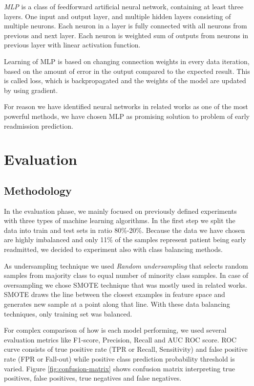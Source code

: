 \documentclass[runningheads]{llncs}
\begin{document}
\emph{MLP} is a class of feedforward artificial neural network, containing at least three layers. One input and output layer, and multiple hidden layers consisting of multiple neurons. Each neuron in a layer is fully connected with all neurons from previous and next layer. Each neuron is weighted sum of outputs from neurons in previous layer with linear activation function.

Learning of MLP is based on changing connection weights in every data iteration, based on the amount of error in the output compared to the expected result. This is called loss, which is backpropagated and the weights of the model are updated by using gradient.

For reason we have identified neural networks in related works as one of the most powerful methods, we have chosen MLP as promising solution to problem of early readmission prediction.


\section{Evaluation}

\subsection{Methodology}
\label{sec:evaluation-methodology}
In the evaluation phase, we mainly focused on previously defined experiments with three types of machine learning algorithms. In the first step we split the data into train and test sets in ratio 80\%-20\%. Because the data we have chosen are highly imbalanced and only 11\% of the samples represent patient being early readmitted, we decided to experiment also with class balancing methods. 

As undersampling technique we used \emph{Random undersampling} that selects random samples from majority class to equal number of minority class samples. In case of oversampling we chose SMOTE technique that was mostly used in related works. SMOTE draws the line between the closest examples in feature space and generates new sample at a point along that line. With these data balancing techniques, only training set was balanced.

For complex comparison of how is each model performing, we used several evaluation metrics like F1-score, Precision, Recall and AUC ROC score. ROC curve consists of true positive rate (TPR or Recall, Sensitivity) and false positive rate (FPR or Fall-out) while positive class prediction probability threshold is varied. Figure \ref{fig:confusion-matrix} shows confusion matrix interpreting true positives, false positives, true negatives and false negatives.
\end{document}
